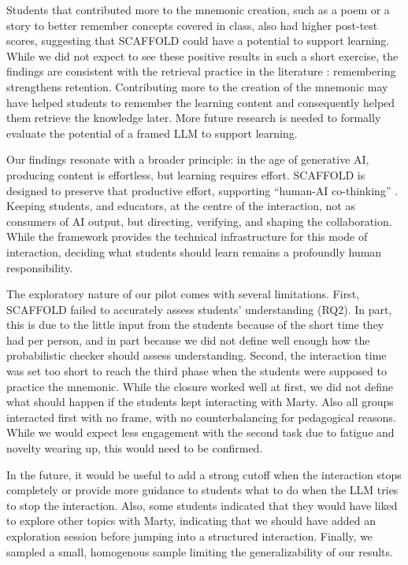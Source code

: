 \documentclass[fleqn,10pt]{wlscirep}
\begin{document}
Students that contributed more to the mnemonic creation, such as a poem or a story to better remember concepts covered in class, also had higher post-test scores, suggesting that SCAFFOLD could have a potential to support learning. While we did not expect to see these positive results in such a short exercise, the findings are consistent with the retrieval practice in the literature \cite{Roediger2011}: remembering strengthens retention. Contributing more to the creation of the mnemonic may have helped students to remember the learning content and consequently helped them retrieve the knowledge later. More future research is needed to formally evaluate the potential of a framed LLM to support learning.

Our findings resonate with a broader principle: in the age of generative AI, producing content is effortless, but learning requires effort. SCAFFOLD is designed to preserve that productive effort, supporting ``human-AI co-thinking'' \cite{BardynForthcoming}. Keeping students, and educators, at the centre of the interaction, not as consumers of AI output, but directing, verifying, and shaping the collaboration. While the framework provides the technical infrastructure for this mode of interaction, deciding what students should learn remains a profoundly human responsibility.

The exploratory nature of our pilot comes with several limitations. First, SCAFFOLD failed to accurately assess students' understanding (RQ2). In part, this is due to the little input from the students because of the short time they had per person, and in part because we did not define well enough how the probabilistic checker should assess understanding. Second, the interaction time was set too short to reach the third phase when the students were supposed to practice the mnemonic. While the closure worked well at first, we did not define what should happen if the students kept interacting with Marty. Also all groups interacted first with no frame, with no counterbalancing for pedagogical reasons. While we would expect less engagement with the second task due to fatigue and novelty wearing up, this would need to be confirmed.

In the future, it would be useful to add a strong cutoff when the interaction stops completely or provide more guidance to students what to do when the LLM tries to stop the interaction. Also, some students indicated that they would have liked to explore other topics with Marty, indicating that we should have added an exploration session before jumping into a structured interaction. Finally, we sampled a small, homogenous sample limiting the generalizability of our results.
\end{document}

